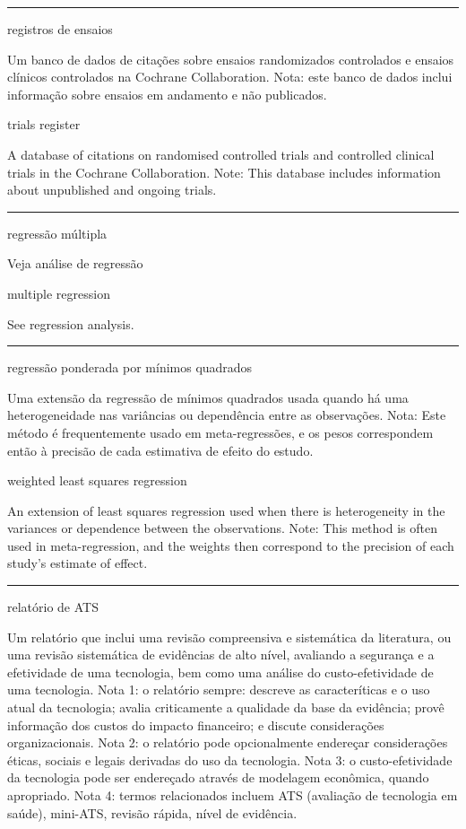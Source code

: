 \documentclass[
]{book}
\begin{document}
\begin{center}\rule{0.5\linewidth}{0.5pt}\end{center}

registros de ensaios

Um banco de dados de citações sobre ensaios randomizados controlados e ensaios clínicos controlados na Cochrane Collaboration. Nota: este banco de dados inclui informação sobre ensaios em andamento e não publicados.

trials register

A database of citations on randomised controlled trials and controlled clinical trials in the Cochrane Collaboration. Note: This database includes information about unpublished and ongoing trials.

\begin{center}\rule{0.5\linewidth}{0.5pt}\end{center}

regressão múltipla

Veja análise de regressão

multiple regression

See regression analysis.

\begin{center}\rule{0.5\linewidth}{0.5pt}\end{center}

regressão ponderada por mínimos quadrados

Uma extensão da regressão de mínimos quadrados usada quando há uma heterogeneidade nas variâncias ou dependência entre as observações. Nota: Este método é frequentemente usado em meta-regressões, e os pesos correspondem então à precisão de cada estimativa de efeito do estudo.

weighted least squares regression

An extension of least squares regression used when there is heterogeneity in the variances or dependence between the observations. Note: This method is often used in meta-regression, and the weights then correspond to the precision of each study's estimate of effect.

\begin{center}\rule{0.5\linewidth}{0.5pt}\end{center}

relatório de ATS

Um relatório que inclui uma revisão compreensiva e sistemática da literatura, ou uma revisão sistemática de evidências de alto nível, avaliando a segurança e a efetividade de uma tecnologia, bem como uma análise do custo-efetividade de uma tecnologia. Nota 1: o relatório sempre: descreve as caracteríticas e o uso atual da tecnologia; avalia criticamente a qualidade da base da evidência; provê informação dos custos do impacto financeiro; e discute considerações organizacionais. Nota 2: o relatório pode opcionalmente endereçar considerações éticas, sociais e legais derivadas do uso da tecnologia. Nota 3: o custo-efetividade da tecnologia pode ser endereçado através de modelagem econômica, quando apropriado. Nota 4: termos relacionados incluem ATS (avaliação de tecnologia em saúde), mini-ATS, revisão rápida, nível de evidência.
\end{document}
